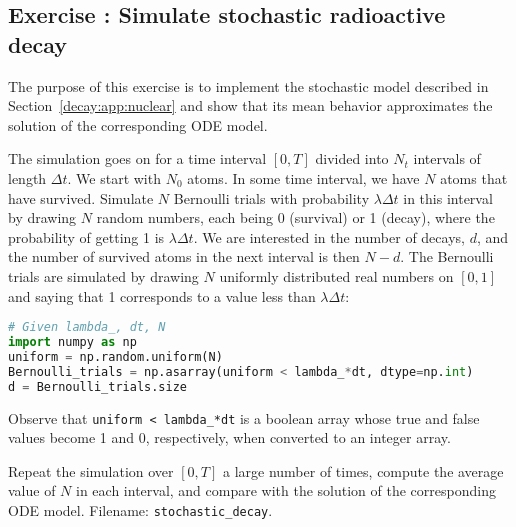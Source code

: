\documentclass[graybox,sectrefs,envcountresetchap,open=right,final]{svmonodo}
\newenvironment{doconceexercise}{}{}
\newcounter{doconceexercisecounter}
\begin{document}
\begin{doconceexercise}

\subsection*{Exercise \thedoconceexercisecounter: Simulate stochastic radioactive decay}

\label{decay:app:exer:stoch:nuclear}

The purpose of this exercise is to implement the stochastic model
described in Section~\ref{decay:app:nuclear} and show that its
mean behavior approximates the solution of the corresponding
ODE model.

The simulation goes on for a time interval $[0,T]$ divided into
$N_t$ intervals of length $\Delta t$. We start with $N_0$
atoms. In some time interval, we have $N$ atoms that have survived.
Simulate $N$ Bernoulli trials with probability $\lambda\Delta t$
in this interval by drawing $N$ random numbers, each being 0 (survival)
or 1 (decay), where the probability of getting 1 is $\lambda\Delta t$.
We are interested in the number of decays, $d$, and the number of
survived atoms in the next interval is then $N-d$.
The Bernoulli trials
are simulated by drawing $N$ uniformly distributed real numbers on
$[0,1]$ and saying that 1 corresponds to a value less than $\lambda\Delta t$:

\begin{lstlisting}[language=Python,style=blue1_bluegreen]
# Given lambda_, dt, N
import numpy as np
uniform = np.random.uniform(N)
Bernoulli_trials = np.asarray(uniform < lambda_*dt, dtype=np.int)
d = Bernoulli_trials.size
\end{lstlisting}
Observe that \Verb!uniform < lambda_*dt! is a boolean array whose true
and false values become 1 and 0, respectively, when converted to an
integer array.

Repeat the simulation over $[0,T]$ a large number of times, compute the average
value of $N$ in each interval, and compare with the solution of
the corresponding ODE model.
\noindent Filename: \Verb!stochastic_decay!.

\end{doconceexercise}
\end{document}
